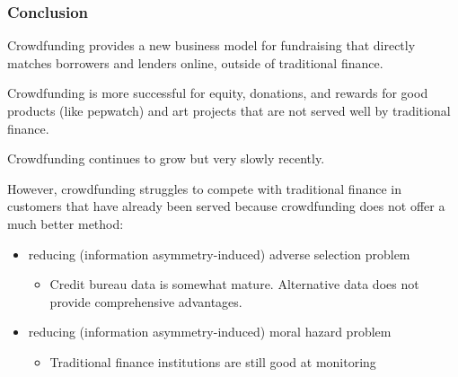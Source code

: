 \documentclass[aspectratio=169,xcolor=dvipsnames]{beamer}
\begin{document}
\begin{frame}
\frametitle{Conclusion}


Crowdfunding provides a new business model for fundraising that directly matches borrowers and lenders online, outside of traditional finance.

\medskip 

Crowdfunding is more successful for equity, donations, and rewards for good products (like pepwatch) and art projects that are not served well by traditional finance. 

\medskip 

Crowdfunding continues to grow but very slowly recently. 

\medskip 

However, crowdfunding struggles to compete with traditional finance in customers that have already been served because crowdfunding does not offer a much better method: 
\begin{itemize}
    \item reducing (information asymmetry-induced) adverse selection problem
    \begin{itemize}
        \item Credit bureau data is somewhat mature. Alternative data does not provide comprehensive advantages. 
    \end{itemize}
    \item reducing (information asymmetry-induced) moral hazard problem
    \begin{itemize}
        \item Traditional finance institutions are still good at monitoring
    \end{itemize}
\end{itemize}




\end{frame} 




































































\end{document}
